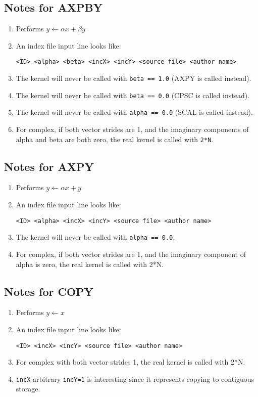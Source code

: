 \documentclass[11pt]{article}
\begin{document}
\subsection{Notes for AXPBY}
\begin{enumerate}
\item Performs $ y \leftarrow \alpha x + \beta y $
\item An index file input line looks like:
\begin{verbatim}
<ID> <alpha> <beta> <incX> <incY> <source file> <author name>
\end{verbatim}

\item The kernel will never be called with {\tt beta == 1.0} (AXPY is called
      instead).
\item The kernel will never be called with {\tt beta == 0.0} (CPSC is called
      instead).
\item The kernel will never be called with {\tt alpha == 0.0} (SCAL is called
      instead).
\item For complex, if both vector strides are 1, and the imaginary
      components of alpha and beta are both zero, the real kernel is
      called with {\tt 2*N}.

\end{enumerate}

\subsection{Notes for AXPY}
\begin{enumerate}
\item Performs $ y \leftarrow \alpha x + y $
\item An index file input line looks like:
\begin{verbatim}
<ID> <alpha> <incX> <incY> <source file> <author name>
\end{verbatim}
\item The kernel will never be called with {\tt alpha == 0.0}.
\item For complex, if both vector strides are 1, and the imaginary component
      of alpha is zero, the real kernel is called with {2*N}.
\end{enumerate}

\subsection{Notes for COPY}
\begin{enumerate}
\item Performs $ y \leftarrow x $
\item
An index file input line looks like:
\begin{verbatim}
<ID> <incX> <incY> <source file> <author name>
\end{verbatim}
\item For complex with both vector strides 1, the real kernel is called with
      {2*N}.
\item {\tt incX} arbitrary {\tt incY=1} is interesting since it represents
      copying to contiguous storage.
\end{enumerate}
\end{document}
